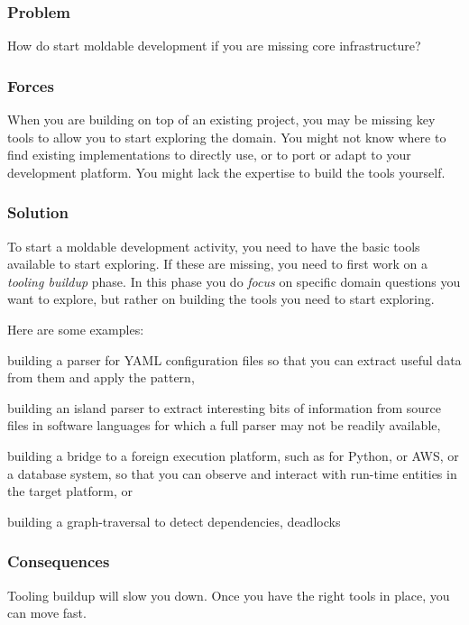 \documentclass[sigconf]{acmart}
\newcommand{\pattern}[1]{\emph{\nameref{pat:#1}}\xspace}
\begin{document}
\subsubsection*{Problem}
How do start moldable development if you are missing core infrastructure?

\subsubsection*{Forces}
When you are building on top of an existing project, you may be missing key tools to allow you to start exploring the domain.
You might not know where to find existing implementations to directly use, or to port or adapt to your development platform.
You might lack the expertise to build the tools yourself.

\subsubsection*{Solution}
To start a moldable development activity, you need to have the basic tools available to start exploring.
If these are missing, you need to first work on a \emph{tooling buildup} phase.
In this phase you do \emph{focus} on specific domain questions you want to explore, but rather on building the tools you need to start exploring.

Here are some examples:
\begin{inparaenum}[(i)]
\item building a parser for YAML configuration files so that you can extract useful data from them and apply the \pattern{moldableDataWrapper} pattern,
\item building an island parser\cite{Kurs14b} to extract interesting bits of information from source files in software languages for which a full parser may not be readily available,
\item building a bridge to a foreign execution platform, such as for Python, or AWS, or a database system, so that you can observe and interact with run-time entities in the target platform, or
\item building a graph-traversal to detect dependencies, deadlocks \etc\end{inparaenum}

\subsubsection*{Consequences}
Tooling buildup will slow you down.
Once you have the right tools in place, you can move fast.
\end{document}
